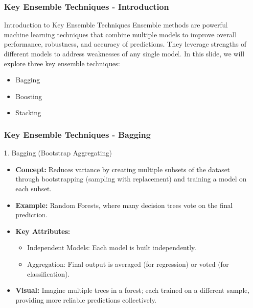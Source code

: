 \documentclass[aspectratio=169]{beamer}
\begin{document}
\begin{frame}[fragile]
    \frametitle{Key Ensemble Techniques - Introduction}
    \begin{block}{Introduction to Key Ensemble Techniques}
        Ensemble methods are powerful machine learning techniques that combine multiple models to improve overall performance, robustness, and accuracy of predictions. 
        They leverage strengths of different models to address weaknesses of any single model. 
        In this slide, we will explore three key ensemble techniques:
        \begin{itemize}
            \item Bagging
            \item Boosting
            \item Stacking
        \end{itemize}
    \end{block}
\end{frame}

\begin{frame}[fragile]
    \frametitle{Key Ensemble Techniques - Bagging}
    \begin{block}{1. Bagging (Bootstrap Aggregating)}
        \begin{itemize}
            \item \textbf{Concept:} Reduces variance by creating multiple subsets of the dataset through bootstrapping (sampling with replacement) and training a model on each subset.
            \item \textbf{Example:} Random Forests, where many decision trees vote on the final prediction.
            \item \textbf{Key Attributes:}
            \begin{itemize}
                \item Independent Models: Each model is built independently.
                \item Aggregation: Final output is averaged (for regression) or voted (for classification).
            \end{itemize}
            \item \textbf{Visual:} Imagine multiple trees in a forest; each trained on a different sample, providing more reliable predictions collectively.
        \end{itemize}
    \end{block}
\end{frame}
\end{document}
